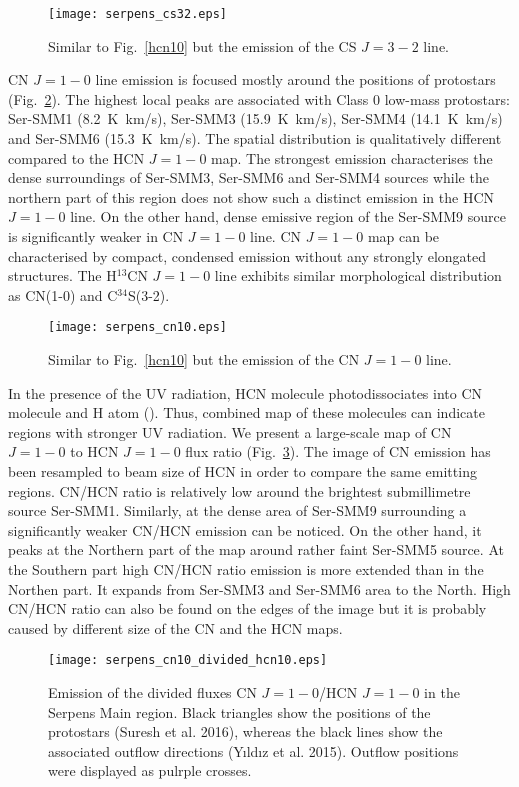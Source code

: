 \documentclass{aa}
\begin{document}
\begin{figure}
\texttt{[image: serpens\_cs32.eps]}
\caption{Similar to Fig.~\ref{hcn10} but the emission of the CS $J=3-2$ line.}
\label{cs32}
\end{figure}

CN $J=1-0$ line emission is focused mostly around the positions of protostars (Fig.~\ref{cn10}). 
The highest local peaks are associated with Class 0 low-mass protostars: Ser-SMM1 (8.2~K~km/s), Ser-SMM3 (15.9~K~km/s), Ser-SMM4 (14.1~K~km/s) and Ser-SMM6 (15.3~K~km/s). The spatial distribution is qualitatively different compared to the HCN $J=1-0$ map. The strongest emission characterises the dense surroundings of Ser-SMM3, Ser-SMM6 and Ser-SMM4 sources while the northern part of this region does not show such a distinct emission in the HCN $J=1-0$ line. On the other hand, dense emissive region of the Ser-SMM9 source is significantly weaker in CN $J=1-0$ line. CN $J=1-0$ map can be characterised by compact, condensed emission without any strongly elongated structures. The H$^{13}$CN $J=1-0$ line exhibits similar morphological distribution as CN(1-0) and \mbox{C$^{34}$S(3-2)}. 

\begin{figure}
\texttt{[image: serpens\_cn10.eps]}
\caption{Similar to Fig.~\ref{hcn10} but the emission of the CN $J=1-0$ line.}
\label{cn10}
\end{figure}

In the presence of the UV radiation, HCN molecule photodissociates into CN molecule and H atom (\cite{Sta05}). Thus, combined map of these molecules can indicate regions with stronger UV radiation. We present a large-scale map of CN $J=1-0$ to HCN $J=1-0$ flux ratio (Fig.~\ref{cn10_div_hcn10}). The image of CN emission has been resampled to beam size of HCN in order to compare the same emitting regions. CN/HCN ratio is relatively low around the brightest submillimetre source Ser-SMM1. Similarly, at the dense area of Ser-SMM9 surrounding a significantly weaker CN/HCN emission can be noticed. On the other hand, it peaks at the Northern part of the map around rather faint Ser-SMM5 source. At the Southern part high CN/HCN ratio emission is more extended than in the Northen part. It expands from Ser-SMM3 and Ser-SMM6 area to the North. High CN/HCN ratio can also be found on the edges of the image but it is probably caused by different size of the CN and the HCN maps.

\begin{figure}
   \centering
   \texttt{[image: serpens\_cn10\_divided\_hcn10.eps]}
      \caption{Emission of the divided fluxes CN $J=1-0$/HCN $J=1-0$ in the Serpens Main region. Black triangles show the positions of the protostars (Suresh et al. 2016), whereas the black lines show the associated outflow directions (Y{\i}ld{\i}z et al. 2015). Outflow positions were displayed as pulrple crosses.}
         \label{cn10_div_hcn10}
   \end{figure}
\end{document}
